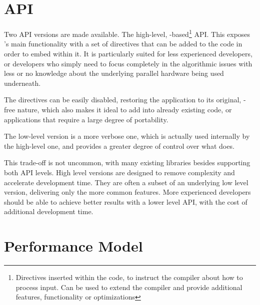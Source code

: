 \documentclass[main.tex]{subfiles}
\begin{document}
\section{API} \label{section:starpu_api}

Two API versions are made available. The high-level, -based\footnote{Directives inserted within the code, to instruct the compiler about how to process input. Can be used to extend the compiler and provide additional features, functionality or optimizations} API. This exposes \starpu's main functionality with a set of directives that can be added to the code in order to embed \starpu within it. It is particularly suited for less experienced developers, or developers who simply need to focus completely in the algorithmic issues with less or no knowledge about the underlying parallel hardware being used underneath.

The directives can be easily disabled, restoring the application to its original, \starpu-free nature, which also makes it ideal to add \starpu into already existing code, or applications that require a large degree of portability.

The low-level version is a more verbose one, which is actually used internally by the high-level one, and provides a greater degree of control over what \starpu does.

This trade-off is not uncommon, with many existing libraries besides \starpu supporting both API levels. High level versions are designed to remove complexity and accelerate development time. They are often a subset of an underlying low level version, delivering only the more common features. More experienced developers should be able to achieve better results with a lower level API, with the cost of additional development time.

\section{Performance Model}
\end{document}
